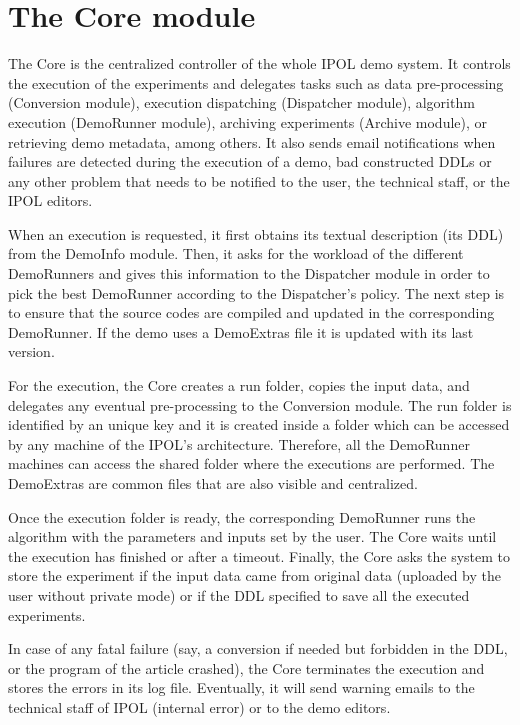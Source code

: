 \section{The Core module}
The Core is the centralized controller of the whole IPOL demo system. It controls the execution of the experiments and delegates tasks such as data pre-processing (Conversion module), execution dispatching (Dispatcher module), algorithm execution (DemoRunner module), archiving experiments (Archive module), or retrieving demo metadata, among others. It also sends email notifications when failures are detected during the execution of a demo, bad constructed DDLs or any other problem that needs to be notified to the user, the technical staff, or the IPOL editors.

When an execution is requested, it first obtains its textual description (its DDL) from the DemoInfo module. Then, it asks for the workload of the different DemoRunners and gives this information to the Dispatcher module in order to pick the best DemoRunner according to the Dispatcher's policy. The next step is to ensure that the source codes are compiled and updated in the corresponding DemoRunner. If the demo uses a DemoExtras file it is updated with its last version.

For the execution, the Core creates a run folder, copies the input data, and delegates any eventual pre-processing to the Conversion module. The run folder is identified by an unique key and it is created inside a folder which can be accessed by any machine of the IPOL's architecture. Therefore, all the DemoRunner machines can access the shared folder where the executions are performed. The DemoExtras are common files that are also visible and centralized.

Once the execution folder is ready, the corresponding DemoRunner runs the algorithm with the parameters and inputs set by the user. The Core waits until the execution has finished or after a timeout. Finally, the Core asks the system to store the experiment if the input data came from original data (uploaded by the user without private mode) or if the DDL specified to save all the executed experiments.

In case of any fatal failure (say, a conversion if needed but forbidden in the DDL, or the program of the article crashed), the Core terminates the execution and stores the errors in its log file. Eventually, it will send warning emails to the technical staff of IPOL (internal error) or to the demo editors.

